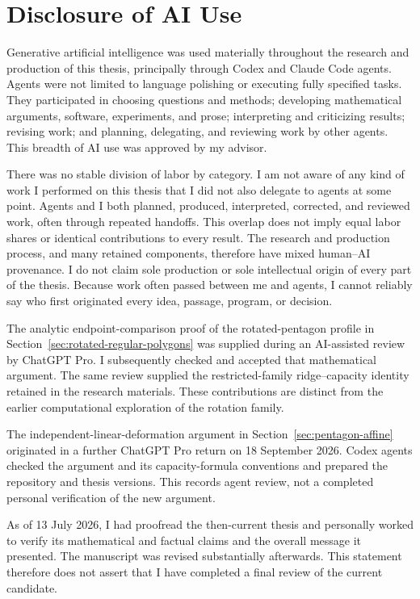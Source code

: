 \clearpage
\section*{Disclosure of AI Use}
{}

Generative artificial intelligence was used materially throughout the research
and production of this thesis, principally through Codex and Claude Code agents.
Agents were not limited to language polishing or executing fully specified
tasks.  They participated in choosing questions and methods; developing
mathematical arguments, software, experiments, and prose; interpreting and
criticizing results; revising work; and planning, delegating, and reviewing work
by other agents.  This breadth of AI use was approved by my advisor.

There was no stable division of labor by category.  I am not aware of any kind
of work I performed on this thesis that I did not also delegate to agents at
some point.  Agents and I both planned, produced, interpreted, corrected, and
reviewed work, often through repeated handoffs.  This overlap does not imply
equal labor shares or identical contributions to every result.  The research
and production process, and many retained components, therefore have mixed
human--AI provenance.  I do not claim sole production or sole intellectual
origin of every part of the thesis.  Because work often passed between me and
agents, I cannot reliably say who first originated every idea, passage,
program, or decision.

The analytic endpoint-comparison proof of the rotated-pentagon profile
in Section~\ref{sec:rotated-regular-polygons} was supplied during an
AI-assisted review by ChatGPT Pro. I subsequently checked and accepted
that mathematical argument. The same review supplied the restricted-family
ridge--capacity identity retained in the research materials.
These contributions are distinct from the earlier computational exploration
of the rotation family.

The independent-linear-deformation argument in
Section~\ref{sec:pentagon-affine} originated in a further ChatGPT Pro
return on 18 September 2026. Codex agents checked the argument and its
capacity-formula conventions and prepared the repository and thesis versions.
This records agent review, not a completed personal verification of the new
argument.

As of 13 July 2026, I had proofread the then-current thesis and personally
worked to verify its mathematical and factual claims and the overall message it
presented.  The manuscript was revised substantially afterwards.  This
statement therefore does not assert that I have completed a final review of the
current candidate.

\clearpage
